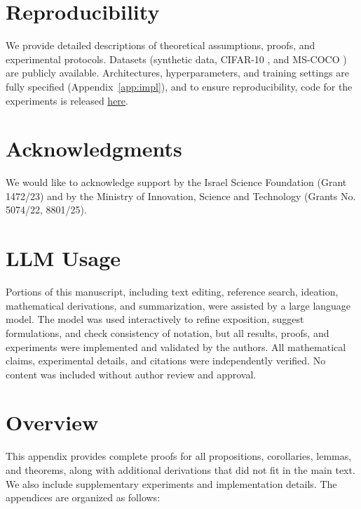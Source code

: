 \documentclass{article}
\begin{document}
\section*{Reproducibility}
We provide detailed descriptions of theoretical assumptions, proofs, and experimental protocols.  
Datasets (synthetic data, CIFAR-10 \citep{krizhevsky2009learning}, and MS-COCO \citep{lin2014microsoft}) are publicly available.  
Architectures, hyperparameters, and training settings are fully specified (Appendix~\ref{app:impl}), and to ensure reproducibility, code for the experiments is released \href{https://github.com/rbetser/InfoNCE-induces-Gaussian-distribution}{here}.

\section*{Acknowledgments}
We would like to acknowledge  
support by the Israel Science Foundation (Grant 1472/23) and by the Ministry of Innovation, Science and Technology (Grants No. 5074/22, 8801/25).




\appendix

\section*{LLM Usage}

Portions of this manuscript, including text editing, reference search, ideation, mathematical derivations, and summarization, were assisted by a large language model.  
The model was used interactively to refine exposition, suggest formulations, and check consistency of notation, but all results, proofs, and experiments were implemented and validated by the authors.  
All mathematical claims, experimental details, and citations were independently verified.  
No content was included without author review and approval.  

\section*{Overview}
This appendix provides complete proofs for all propositions, corollaries, lemmas, and theorems, along with additional derivations that did not fit in the main text. We also include supplementary experiments and implementation details. The appendices are organized as follows:
\end{document}
